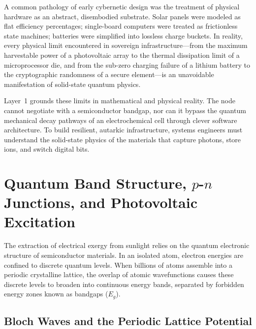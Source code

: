 A common pathology of early cybernetic design was the treatment of physical hardware as an abstract, disembodied substrate. Solar panels were modeled as flat efficiency percentages; single-board computers were treated as frictionless state machines; batteries were simplified into lossless charge buckets. In reality, every physical limit encountered in sovereign infrastructure---from the maximum harvestable power of a photovoltaic array to the thermal dissipation limit of a microprocessor die, and from the sub-zero charging failure of a lithium battery to the cryptographic randomness of a secure element---is an unavoidable manifestation of solid-state quantum physics.

Layer~1 grounds these limits in mathematical and physical reality. The node cannot negotiate with a semiconductor bandgap, nor can it bypass the quantum mechanical decay pathways of an electrochemical cell through clever software architecture. To build resilient, autarkic infrastructure, systems engineers must understand the solid-state physics of the materials that capture photons, store ions, and switch digital bits.

\section{Quantum Band Structure, \texorpdfstring{$p$-$n$}{p-n} Junctions, and Photovoltaic Excitation}

The extraction of electrical exergy from sunlight relies on the quantum electronic structure of semiconductor materials. In an isolated atom, electron energies are confined to discrete quantum levels. When billions of atoms assemble into a periodic crystalline lattice, the overlap of atomic wavefunctions causes these discrete levels to broaden into continuous energy bands, separated by forbidden energy zones known as bandgaps ($E_g$).

\subsection{Bloch Waves and the Periodic Lattice Potential}

